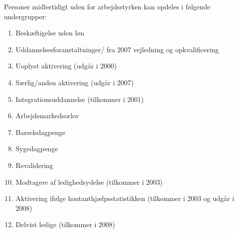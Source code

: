 Personer midlertidigt uden for arbejdsstyrken kan opdeles i følgende undergrupper:
\begin{enumerate} [topsep=6pt,itemsep=-1ex]
  \item Beskæftigelse uden løn
  \item Uddannelsesforanstaltninger/ fra 2007 vejledning og opkvalificering
  \item Uoplyst aktivering (udgår i 2000)
  \item Særlig/anden aktivering (udgår i 2007)
  \item Integrationsuddannelse (tilkommer i 2001)
  \item Arbejdsmarkedsorlov
  \item Barselsdagpenge
  \item Sygedagpenge
  \item Revalidering
  \item Modtagere af ledighedsydelse (tilkommer i 2003)
  \item Aktivering ifølge kontanthjælpsstatistikken (tilkommer i 2003 og udgår i 2008)
  \item Delvist ledige (tilkommer i 2008)
\end{enumerate}

